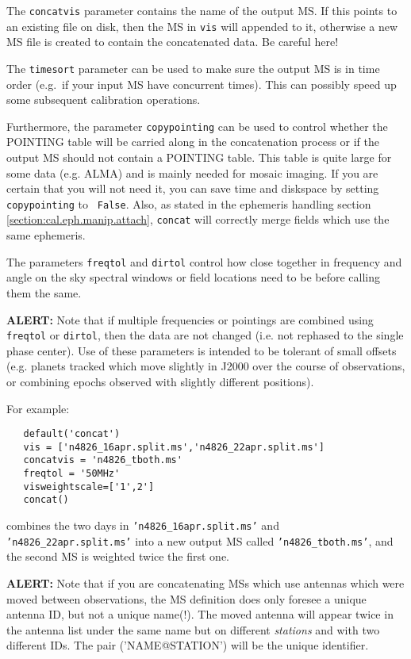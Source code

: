 The {\tt concatvis} parameter contains the name of the output MS.
If this points to an existing file on disk, then the MS in
{\tt vis} will appended to it,  otherwise a new MS file
is created to contain the concatenated data.  Be careful here!

The {\tt timesort} parameter can be used to make sure the output
MS is in time order (e.g.\ if your input MS have concurrent times).
This can possibly speed up some subsequent calibration operations.

Furthermore, the parameter {\tt copypointing} can be used to control
whether the POINTING table will be carried along in the concatenation
process or if the output MS should not contain a POINTING table. This
table is quite large for some data (e.g. ALMA) and is mainly needed
for mosaic imaging.  If you are certain that you will not need it, you
can save time and diskspace by setting {\tt copypointing} to {\tt
  False}.  Also, as stated in the ephemeris handling section
\ref{section:cal.eph.manip.attach}, {\tt concat}
will correctly merge fields which use the same ephemeris.

The parameters {\tt freqtol} and {\tt dirtol} control how close
together in frequency and angle on the sky spectral windows or field
locations need to be before calling them the same.

{\bf ALERT:} Note that if multiple frequencies or pointings are
combined using {\tt freqtol} or {\tt dirtol}, then the data are not
changed (i.e. not rephased to the single phase center).  Use of these 
parameters is intended to be tolerant of small offsets (e.g. planets
tracked which move slightly in J2000 over the course of observations,
or combining epochs observed with slightly different positions).

For example:
\small
\begin{verbatim}
   default('concat')
   vis = ['n4826_16apr.split.ms','n4826_22apr.split.ms']
   concatvis = 'n4826_tboth.ms'
   freqtol = '50MHz'
   visweightscale=['1',2']
   concat()
\end{verbatim}
\normalsize
combines the two days in {\tt 'n4826\_16apr.split.ms'} and
{\tt 'n4826\_22apr.split.ms'} into a new output MS called
{\tt 'n4826\_tboth.ms'}, and the second MS is weighted twice the first one.


{\bf ALERT:} Note that if you are concatenating MSs which use
antennas which were moved between observations, the MS definition 
does only foresee a unique antenna ID, but not a unique name(!). 
The moved antenna will
appear twice in the antenna list under the same name but on different
{\it stations} and with two different IDs. The pair ('NAME@STATION')
will be the unique identifier.

